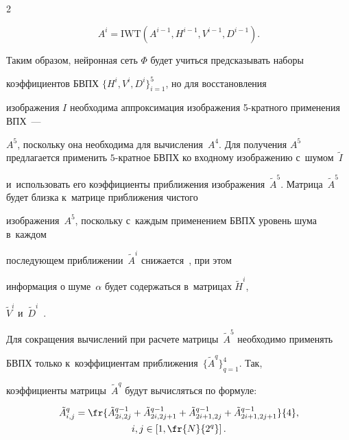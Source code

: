 \begin{multicols}{2}
\begin{equation*}
\end{equation*}


\begin{equation*}


A^i =\mathrm{IWT}\left(A^{i-1}, H^{i-1}, V^{i-1}, D^{i-1}\right).


\end{equation*}





Таким образом, нейронная сеть $\Phi$ будет учиться предсказывать наборы 


коэффициентов БВПХ $\{H^i, V^i, D^i\}_{i=1}^5$, но для восстановления 


изображения $I$ необходима аппроксимация изображения \mbox{5-крат}\-но\-го применения ВПХ~--- 


$A^5$, поскольку она необходима для вычисления~$A^4$. Для получения $A^5$ предлагается применить $5$-кратное БВПХ ко входному изображению с~шумом~$\tilde{I}$ 


и~использовать его коэффициенты приближения изображения~$\tilde{A}^5$. Матрица~$\tilde{A}^5$ будет близка к~матрице приближения чистого 


изображения~$A^5$, поскольку с~каждым применением БВПХ уровень шума в~каждом 


последующем приближении~$\tilde{A}^i$ снижается~\cite{WAVELETS_APPROX}, при этом 


информация о шуме~$\alpha$ будет содержаться в~матрицах $\tilde{H}^i$, 


$\tilde{V}^i$ и~$\tilde{D}^i$~\cite{WAVELETS_NOISE}.





Для сокращения вычислений при расчете мат\-ри\-цы~$\tilde{A}^5$ необходимо применять 


БВПХ только к~коэффициентам приближения~$\{\tilde{A}^q\}_{q=1}^4$. Так, 


коэффициенты матрицы~$\tilde{A}^q$ будут вычисляться по формуле:


\begin{multline*}


\tilde{A}_{i,j}^q = \fr{\tilde{A}_{2i, 2j}^{q-1} + \tilde{A}_{2i, 2j+1}^{q-1} + 


\tilde{A}_{2i+1, 2j}^{q-1} + \tilde{A}_{2i+1, 2j+1}^{q-1}}{4},\\


 i,j \in \left[1, \fr{N}{2^q}\right].


\end{multline*}






\end{multicols}
